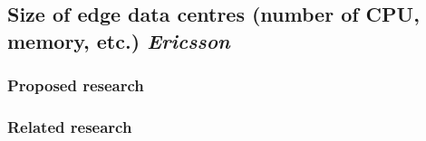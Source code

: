 \subsection{Size of edge data centres (number of CPU, memory, etc.) \emph{Ericsson}}
\subsubsection{Proposed research}
\subsubsection{Related research}
